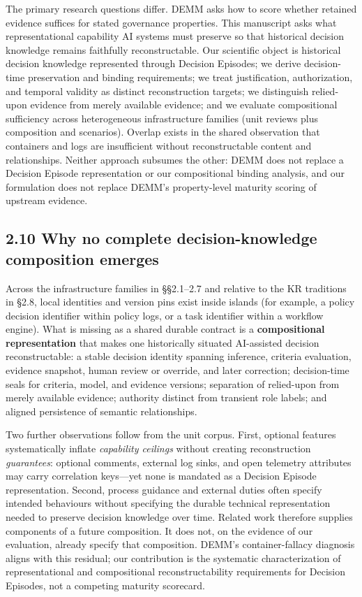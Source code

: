 \documentclass[11pt,a4paper]{article}
\begin{document}
The primary research questions differ. DEMM asks how to score whether retained evidence suffices for stated governance properties. This manuscript asks what representational capability AI systems must preserve so that historical decision knowledge remains faithfully reconstructable. Our scientific object is historical decision knowledge represented through Decision Episodes; we derive decision-time preservation and binding requirements; we treat justification, authorization, and temporal validity as distinct reconstruction targets; we distinguish relied-upon evidence from merely available evidence; and we evaluate compositional sufficiency across heterogeneous infrastructure families (unit reviews plus composition and scenarios). Overlap exists in the shared observation that containers and logs are insufficient without reconstructable content and relationships. Neither approach subsumes the other: DEMM does not replace a Decision Episode representation or our compositional binding analysis, and our formulation does not replace DEMM's property-level maturity scoring of upstream evidence.


\subsection{2.10 Why no complete decision-knowledge composition emerges}

Across the infrastructure families in §§2.1--2.7 and relative to the KR traditions in §2.8, local identities and version pins exist inside islands (for example, a policy decision identifier within policy logs, or a task identifier within a workflow engine). What is missing as a shared durable contract is a \textbf{compositional representation} that makes one historically situated AI-assisted decision reconstructable: a stable decision identity spanning inference, criteria evaluation, evidence snapshot, human review or override, and later correction; decision-time seals for criteria, model, and evidence versions; separation of relied-upon from merely available evidence; authority distinct from transient role labels; and aligned persistence of semantic relationships.


Two further observations follow from the unit corpus. First, optional features systematically inflate \emph{capability ceilings} without creating reconstruction \emph{guarantees}: optional comments, external log sinks, and open telemetry attributes may carry correlation keys---yet none is mandated as a Decision Episode representation. Second, process guidance and external duties often specify intended behaviours without specifying the durable technical representation needed to preserve decision knowledge over time. Related work therefore supplies components of a future composition. It does not, on the evidence of our evaluation, already specify that composition. DEMM's container-fallacy diagnosis aligns with this residual; our contribution is the systematic characterization of representational and compositional reconstructability requirements for Decision Episodes, not a competing maturity scorecard.
\end{document}
